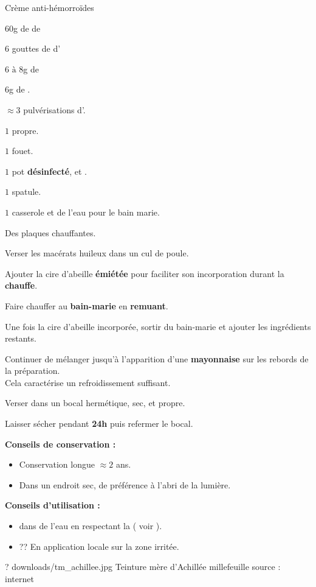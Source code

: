 \label{hemorroides}
\ficherecette
{%
    Crème anti-hémorroïdes
}
{%
    \item $60$g de  de 
    \item $6$ gouttes de  d'
    \item $6 \text{ à }8$g de 
    \item $6$g de .
    \item $\approx 3$ pulvérisations d'.
}
{%
    \item $1$  propre. 
    \item $1$ fouet. 
    \item $1$ pot \textbf{désinfecté},  et .
    \item $1$ spatule. 
    \item $1$ casserole et de l'eau pour le bain marie. 
    \item Des plaques chauffantes. 
}
{%
    \item Verser les macérats huileux dans un cul de poule. 
    \item Ajouter la cire d'abeille \textbf{émiétée} pour faciliter son incorporation durant la \textbf{chauffe}.
    \item Faire chauffer au \textbf{bain-marie} en \textbf{remuant}.
    \item Une fois la cire d'abeille incorporée, sortir du bain-marie et ajouter les ingrédients restants. 
    \item Continuer de mélanger jusqu'à l'apparition d'une \textbf{mayonnaise} sur les rebords de la préparation. \\
            Cela caractérise un refroidissement suffisant.
    \item Verser dans un bocal hermétique, sec, et propre. 
    \item Laisser sécher pendant \textbf{24h} puis refermer le bocal. 

}
{%
    \textbf{Conseils de conservation :}

    \begin{itemize}[label=\faPen]
        \item Conservation longue $\approx 2$ ans.
        \item Dans un endroit sec, de préférence à l'abri de la lumière. 
    \end{itemize}
    \textbf{Conseils d'utilisation :}

    \begin{itemize}[label=\faPen]
        \item {} dans de l'eau en respectant la  ( voir  ).
        \item ?? En application locale sur la zone irritée.
    \end{itemize}
}
{%
    ?
}
{%
    downloads/tm_achillee.jpg
}
{%
   Teinture mère d'Achillée millefeuille
}
{%
    source : internet
}